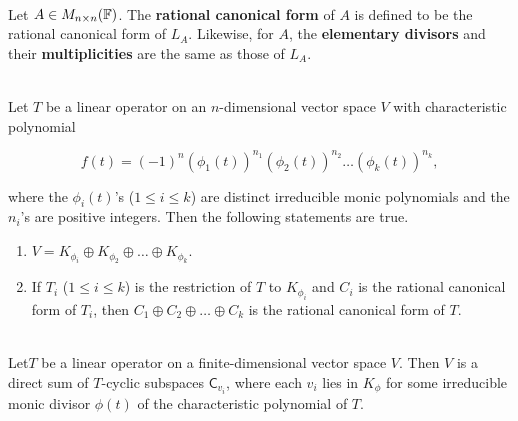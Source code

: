 \begin{definition}
	\hfill\\
	Let $A \in M_{n \times n}(\mathbb{F})$. The \textbf{rational canonical form} of $A$ is defined to be the rational canonical form of $L_A$. Likewise, for $A$, the \textbf{elementary divisors} and their \textbf{multiplicities} are the same as those of $L_A$.
\end{definition}

\begin{theorem}
	\hfill\\
	Let $T$ be a linear operator on an $n$-dimensional vector space $V$ with characteristic polynomial

	\[f(t) = (-1)^n(\phi_1(t))^{n_1} (\phi_2(t))^{n_2} \dots (\phi_k(t))^{n_k},\]

	where the $\phi_i(t)$'s ($1 \leq i \leq k$) are distinct irreducible monic polynomials and the $n_i$'s are positive integers. Then the following statements are true.

	\begin{enumerate}
		\item $V = K_{\phi_i} \oplus K_{\phi_2} \oplus \dots \oplus K_{\phi_k}$.
		\item If $T_i$ ($1 \leq i \leq k$) is the restriction of $T$ to $K_{\phi_i}$ and $C_i$ is the rational canonical form of $T_i$, then $C_1 \oplus C_2 \oplus \dots \oplus C_k$ is the rational canonical form of $T$.
	\end{enumerate}
\end{theorem}

\begin{theorem}
	\hfill\\
	Let$T$ be a linear operator on a finite-dimensional vector space $V$. Then $V$ is a direct sum of $T$-cyclic subspaces $\mathsf{C}_{v_i}$, where each $v_i$ lies in $K_\phi$ for some irreducible monic divisor $\phi(t)$ of the characteristic polynomial of $T$.
\end{theorem}
